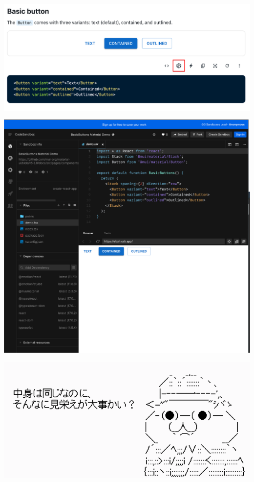 \begin{reviewimage}%
\includegraphics[width=0.6\maxwidth]{./images/03-todo-with-react/mui001-mui_compo_sample.png}%
\label{image:03-todo-with-react:mui001-mui_compo_sample}
\end{reviewimage}
\begin{reviewimage}%
\includegraphics[width=0.6\maxwidth]{./images/03-todo-with-react/mui002-codesandbox.png}%
\label{image:03-todo-with-react:mui002-codesandbox}
\end{reviewimage}
\begin{reviewimage}[H]%
\includegraphics[width=0.7\maxwidth]{./images/03-todo-with-react/yaruo-ui.png}%
\label{image:03-todo-with-react:yaruo-ui}
\end{reviewimage}

